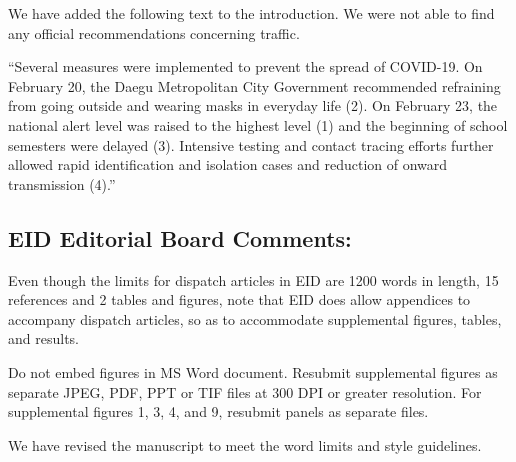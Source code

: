 \documentclass[12pt]{article}
\newcommand{\rev}{\subsection*}
\newcommand{\revtext}{\textsf}
\begin{document}
We have added the following text to the introduction. We were not able to find any official recommendations concerning traffic.

``Several measures were implemented to prevent the spread of COVID-19. On February 20,
the Daegu Metropolitan City Government recommended refraining from going outside and
wearing masks in everyday life (2). On February 23, the national alert level was raised to the
highest level (1) and the beginning of school semesters were delayed (3). Intensive testing and
contact tracing efforts further allowed rapid identification and isolation cases and reduction of
onward transmission (4).''

\rev{EID Editorial Board Comments:}

\revtext{Even though the limits for dispatch articles in EID are 1200 words in length, 15 references and 2 tables and figures, note that EID does allow appendices to accompany dispatch articles, so as to accommodate supplemental figures, tables, and results.}

\revtext{Do not embed figures in MS Word document. Resubmit supplemental figures as separate JPEG, PDF, PPT or TIF files at 300 DPI or greater resolution. For supplemental figures 1, 3, 4, and 9, resubmit panels as separate files.}

We have revised the manuscript to meet the word limits and style guidelines.
\end{document}

